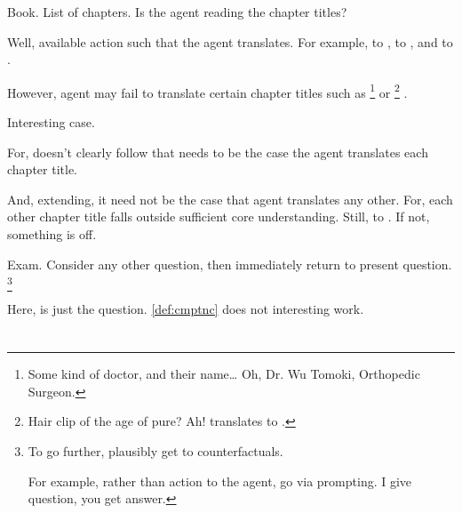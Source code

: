 \begin{note}
  \begin{illustration}[Translation]
    Book.
    List of chapters.
    Is the agent reading the chapter titles?
  \end{illustration}

  Well, available action such that the agent translates.
  For example,  to ,  to , and  to .

  However, agent may fail to translate certain chapter titles such as %
  \footnote{
    Some kind of doctor, and their name\dots
    Oh, Dr. Wu Tomoki, Orthopedic Surgeon.
  }
  or %
  \footnote{
    Hair clip of the age of pure?
    Ah!  translates to .
  }%
  .

  Interesting case.

  For, doesn't clearly follow that needs to be the case the agent translates each chapter title.

  And, extending, it need not be the case that agent translates any other.
  For, each other chapter title falls outside sufficient core understanding.
  Still,  to .
  If not, something is off.
\end{note}

\begin{note}
  \begin{illustration}[Focus]
    Exam.
    Consider any other question, then immediately return to present question.%
    \footnote{
      To go further, plausibly get to counterfactuals.

      For example, rather than action to the agent, go via prompting.
      I give question, you get answer.
    }
  \end{illustration}

  Here, \tRep{} is just the question.
  \autoref{def:cmptnc} does not interesting work.
\end{note}

\section{}
\label{cha:typical:sec:sTR}

